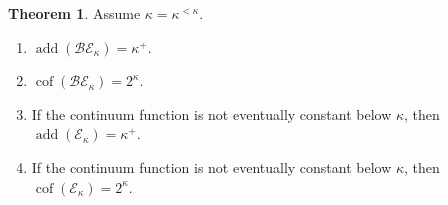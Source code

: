 \documentclass[11pt,nosumlimits,fleqn,reqno]{amsart}
\theoremstyle{definition}
\newtheorem{thm}{Theorem}[section]
\newcommand{\cal}{\mathcal}
\newcommand{\cof}{\operatorname{cof}}
\newcommand{\add}{\operatorname{add}}
\newcommand{\Ek}{\cal{E}_\kappa}
\newcommand{\BEk}{\cal{BE}_\kappa}
\begin{document}
	\begin{thm}\label{thm:add BEk and Ek are absolute}
		Assume $\kappa=\kappa^{<\kappa}$.
		\begin{enumerate}[label=(\arabic*)]
			\item\label{thm:add BEk is absolute} $\add(\BEk)=\kappa^+$.
			\item\label{thm:cof BEk is absolute} $\cof(\BEk)=2^\kappa$.
			\item\label{thm:add Ek is absolute} If the continuum function is not eventually constant below $\kappa$, then $\add(\Ek)=\kappa^+$.
			\item\label{thm:cof Ek is absolute} If the continuum function is not eventually constant below $\kappa$, then $\cof(\Ek)=2^\kappa$.
		\end{enumerate}
	\end{thm}
\end{document}
